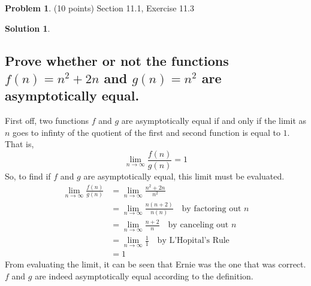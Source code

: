 \documentclass{article}
\theoremstyle{definition}
\newtheorem{problem}{Problem}
\newtheorem*{solution}{Solution}
\begin{document}
\newpage
\begin{problem} (10 points) Section 11.1, Exercise 11.3 
\end{problem}
\begin{solution}
\hspace{1cm}
\subsection*{Prove whether or not the functions $f(n) = n^2 + 2n$ and $g(n) = n^2$ are asymptotically equal.}
First off, two functions $f$ and $g$ are asymptotically equal if and only if the limit as $n$ goes to infinty of the quotient of the first and second function is equal to $1$. That is,\\
\[\lim_{n\to\infty}\frac{f(n)}{g(n)} = 1\]
So, to find if $f$ and $g$ are asymptotically equal, this limit must be evaluated.
\begin{align*}
 \lim_{n\to\infty}\frac{f(n)}{g(n)} &=\lim_{n\to\infty}\frac{n^2+2n}{n^2}\\
&= \lim_{n\to\infty}\frac{n(n+2)}{n(n)} \quad \mbox{by factoring out $n$}\\
&= \lim_{n\to\infty}\frac{n+2}{n} \quad \mbox{by canceling out $n$}\\
&= \lim_{n\to\infty}\frac{1}{1} \quad \mbox{by L'Hopital's Rule}\\
&= 1
\end{align*}
From evaluating the limit, it can be seen that Ernie was the one that was correct. $f$ and $g$ are indeed asymptotically equal according to the definition.
\end{solution}
\end{document}
